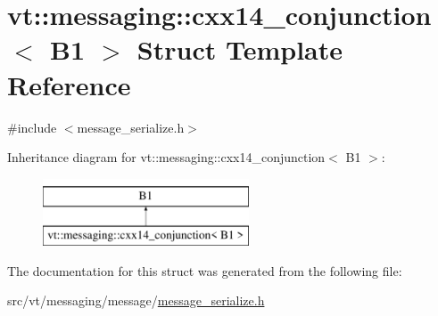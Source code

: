 \hypertarget{structvt_1_1messaging_1_1cxx14__conjunction_3_01_b1_01_4}{}\section{vt\+:\+:messaging\+:\+:cxx14\+\_\+conjunction$<$ B1 $>$ Struct Template Reference}
\label{structvt_1_1messaging_1_1cxx14__conjunction_3_01_b1_01_4}


{\ttfamily \#include $<$message\+\_\+serialize.\+h$>$}

Inheritance diagram for vt\+:\+:messaging\+:\+:cxx14\+\_\+conjunction$<$ B1 $>$\+:\begin{figure}[H]
\begin{center}
\leavevmode
\includegraphics[height=2.000000cm]{structvt_1_1messaging_1_1cxx14__conjunction_3_01_b1_01_4}
\end{center}
\end{figure}


The documentation for this struct was generated from the following file\+:\begin{DoxyCompactItemize}
\item 
src/vt/messaging/message/\hyperlink{message__serialize_8h}{message\+\_\+serialize.\+h}\end{DoxyCompactItemize}
